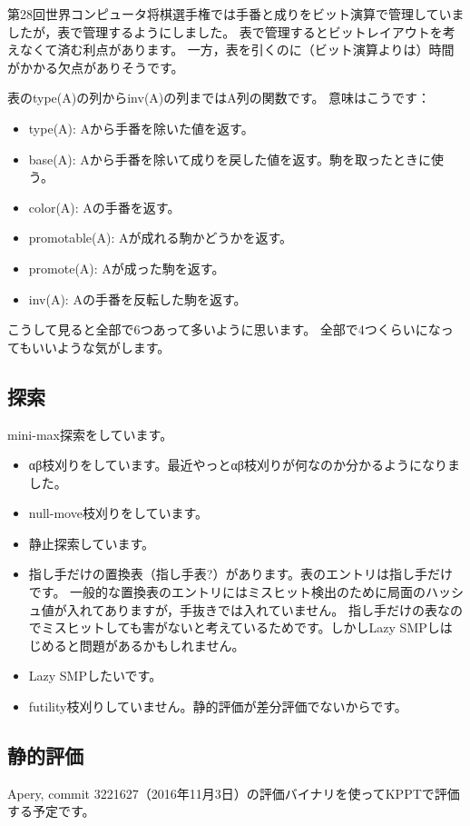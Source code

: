 \documentclass[a4paper]{ltjsarticle}
\begin{document}
第28回世界コンピュータ将棋選手権では手番と成りをビット演算で管理していましたが，表で管理するようにしました。
表で管理するとビットレイアウトを考えなくて済む利点があります。
一方，表を引くのに（ビット演算よりは）時間がかかる欠点がありそうです。

表のtype(A)の列からinv(A)の列まではA列の関数です。
意味はこうです：

\begin{itemize}
  \item type(A): Aから手番を除いた値を返す。
  \item base(A): Aから手番を除いて成りを戻した値を返す。駒を取ったときに使う。
  \item color(A): Aの手番を返す。
  \item promotable(A): Aが成れる駒かどうかを返す。
  \item promote(A): Aが成った駒を返す。
  \item inv(A): Aの手番を反転した駒を返す。
\end{itemize}

こうして見ると全部で6つあって多いように思います。
全部で4つくらいになってもいいような気がします。


\subsection{探索}

mini-max探索をしています。

\begin{itemize}
  \item αβ枝刈りをしています。最近やっとαβ枝刈りが何なのか分かるようになりました。
  \item null-move枝刈りをしています。
  \item 静止探索しています。
  \item 指し手だけの置換表（指し手表?）があります。表のエントリは指し手だけです。
  一般的な置換表のエントリにはミスヒット検出のために局面のハッシュ値が入れてありますが，手抜きでは入れていません。
  指し手だけの表なのでミスヒットしても害がないと考えているためです。しかしLazy SMPしはじめると問題があるかもしれません。
  \item Lazy SMPしたいです。
  \item futility枝刈りしていません。静的評価が差分評価でないからです。
\end{itemize}


\subsection{静的評価}

Apery, commit 3221627（2016年11月3日）の評価バイナリを使ってKPPTで評価する予定です。
\end{document}
